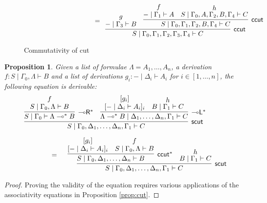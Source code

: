 \documentclass[sn-mathphys-num]{sn-jnl}%
\newcommand{\GG}{\Gamma}
\newcommand{\GD}{\Delta}
\newcommand{\GL}{\Lambda}
\newcommand{\vd}{\vdash}
\newcommand{\tr}{\otimes\mathsf{R}}
\newcommand{\lolli}{\multimap}
\newcommand{\lleft}{{\lolli}\mathsf{L}}
\newcommand{\lright}{{\lolli}\mathsf{R}}
\newcommand{\proofbox}[1]{\begin{tabular}{l} #1 \end{tabular}}
\newcommand{\mf}[1]{\mathsf{#1}}
\newcommand{\scut}[2]{\mf{scut} (#1 , #2)}
\theoremstyle{thmstyleone}%
\newtheorem{proposition}[theorem]{Proposition}%
\theoremstyle{thmstyletwo}%
\theoremstyle{thmstylethree}%
\begin{document}
\begin{figure}
\begin{displaymath}
\begin{array}{l}
      \qquad \qquad \qquad \qquad \qquad  =
      \begin{array}{c}
        \infer[\mf{ccut}]{S \mid \GG_0 , \GG_1 , \GG_2 , \GG_3 , \GG_4 \vd C}{
        \deduce{{-} \mid \GG_3 \vd B}{g}
        &
        \infer[\mf{ccut}]{S \mid \GG_0 , \GG_1 , \GG_2 , B , \GG_4 \vd C}{
        \deduce{{-} \mid \GG_1 \vd A}{f}
        &
        \deduce{S \mid \GG_0 , A , \GG_2 , B , \GG_4 \vd C}{h}
        }
        }
      \end{array}
    \end{array}
  \end{displaymath}
  \caption{Commutativity of cut}
  \label{fig:commcut}
\end{figure}

\begin{proposition}\label{scut-or-ols}
Given a list of formulae $\GL = A_1, \dots , A_n$, a derivation $f : S \mid \GG_0 , \GL \vd B$ and a list of derivations $g_i : {-} \mid \GD_i \vd A_i$ for $i \in [1,\dots , n]$, the following equation is derivable:
\begin{displaymath}
  \begin{array}{l}
    \infer[\mf{scut}]{S \mid \GG_0, \GD_1,\dots,\GD_n, \GG_1 \vd C}{
    \infer[\lright^*]{S \mid \GG_0 \vd \GL \lolli^* B}{
    \deduce{S \mid \GG_0 , \GL \vd B}{f}
    }
    &
    \infer[\lleft^*]{\GL \lolli^* B \mid \GD_1,\dots,\GD_n , \GG_1 \vd C}{
    \deduce{[ {-} \mid \GD_i \vd A_i]_i}{[g_i]}
    &
    \deduce{B \mid \GG_1 \vd C}{h}
    }
    }
    \\[10pt]
    \qquad \qquad
    =
    \proofbox{
    \infer[\mf{scut}]{S \mid \GG_0, \GD_1,\dots,\GD_n, \GG_1 \vd C}{
    \infer[\mf{ccut}^*]{S \mid \GG_0 , \GD_1,\dots,\GD_n \vd B}{
    \deduce{[ {-} \mid \GD_i \vd A_i]_i}{[g_i]}
    &
    \deduce{S \mid \GG_0 , \GL \vd B}{f}
    }
    &
    \deduce{B \mid \GG_1 \vd C}{h}
    }
    }
  \end{array}
\end{displaymath} 
\end{proposition}
\begin{proof}
  Proving the validity of the equation requires various applications of the associativity equations in Proposition \ref{prop:cut}.
\end{proof}
\end{document}
